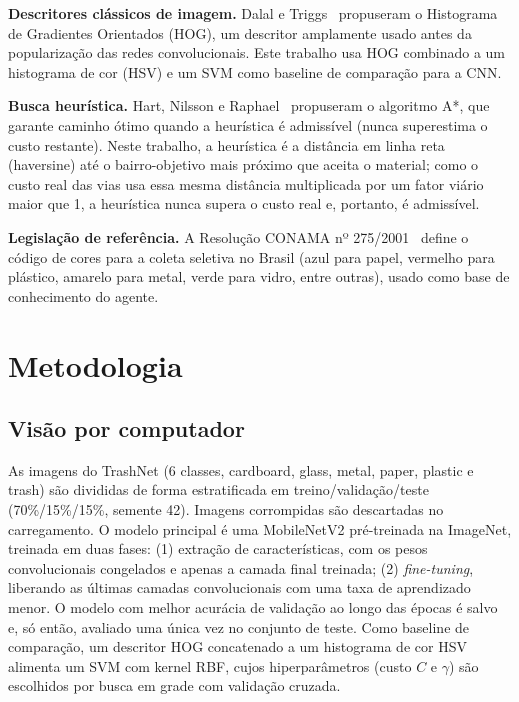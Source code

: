 \documentclass[conference]{IEEEtran}
\begin{document}
\textbf{Descritores clássicos de imagem.} Dalal e Triggs~\cite{dalal2005hog} propuseram o
Histograma de Gradientes Orientados (HOG), um descritor amplamente usado antes da popularização
das redes convolucionais. Este trabalho usa HOG combinado a um histograma de cor (HSV) e um
SVM como baseline de comparação para a CNN.

\textbf{Busca heurística.} Hart, Nilsson e Raphael~\cite{hart1968astar} propuseram o algoritmo
A*, que garante caminho ótimo quando a heurística é admissível (nunca superestima o custo
restante). Neste trabalho, a heurística é a distância em linha reta (haversine) até o
bairro-objetivo mais próximo que aceita o material; como o custo real das vias usa essa mesma
distância multiplicada por um fator viário maior que 1, a heurística nunca supera o custo
real e, portanto, é admissível.

\textbf{Legislação de referência.} A Resolução CONAMA nº 275/2001~\cite{conama275} define o
código de cores para a coleta seletiva no Brasil (azul para papel, vermelho para plástico,
amarelo para metal, verde para vidro, entre outras), usado como base de conhecimento do agente.

\section{Metodologia}
\label{sec:metodologia}

\subsection{Visão por computador}

As imagens do TrashNet (6 classes, cardboard, glass, metal, paper, plastic e trash) são
divididas de forma estratificada em treino/validação/teste (70\%/15\%/15\%, semente 42).
Imagens corrompidas são descartadas no carregamento. O modelo principal é uma MobileNetV2
pré-treinada na ImageNet, treinada em duas fases: (1) extração de características, com os
pesos convolucionais congelados e apenas a camada final treinada; (2) \textit{fine-tuning},
liberando as últimas camadas convolucionais com uma taxa de aprendizado menor. O modelo com
melhor acurácia de validação ao longo das épocas é salvo e, só então, avaliado uma única vez
no conjunto de teste. Como baseline de comparação, um descritor HOG concatenado a um
histograma de cor HSV alimenta um SVM com kernel RBF, cujos hiperparâmetros (custo $C$ e
$\gamma$) são escolhidos por busca em grade com validação cruzada.
\end{document}
